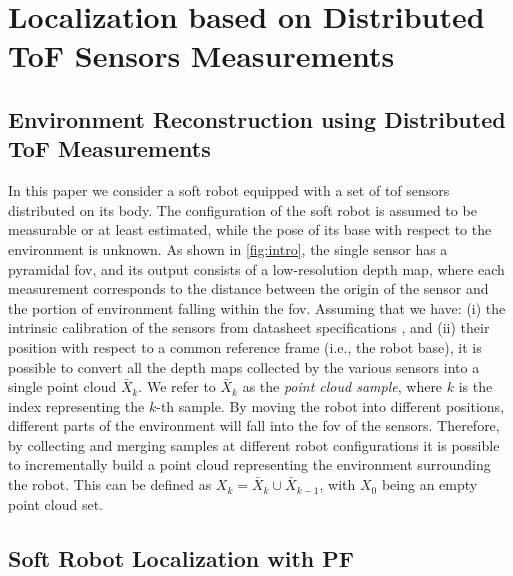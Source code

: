 
\section{Localization based on Distributed ToF Sensors Measurements}\label{sec:methodology}

\subsection{Environment Reconstruction using Distributed ToF Measurements}

In this paper we consider a soft robot equipped with a set of \gls{tof} sensors  distributed on its body. The configuration of the soft robot is assumed to be measurable or at least estimated, while the pose of its base with respect to the environment is unknown. 
As shown in \cref{fig:intro}, the single sensor has a pyramidal \gls{fov}, and its output consists of a low-resolution depth map, where each measurement corresponds to the distance between the origin of the sensor and the portion of environment falling within the \gls{fov}.
Assuming that we have: (i) the intrinsic calibration of the sensors from datasheet specifications \cite{st_vl53l5cx_datasheet}, and (ii) their position with respect to a common reference frame (i.e., the robot base), it is possible to convert all the depth maps collected by the various sensors into a single point cloud $\bar{X}_k$. We refer to $\bar{X}_k$ as the \textit{point cloud sample}, where $k$ is the index representing the $k$-th sample.
%
By moving the robot into different positions, different parts of the environment will fall into the \gls{fov} of the sensors. Therefore, by collecting and merging samples at different robot configurations it is possible to incrementally build a point cloud representing the environment surrounding the robot.
This can be defined as  $X_k = \bar{X}_k \cup \bar{X}_{k-1}$, with $X_0$ being an empty point cloud set.


\subsection{Soft Robot Localization with PF}

